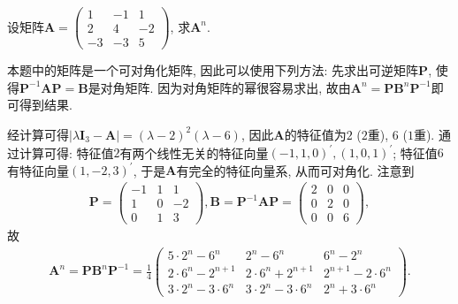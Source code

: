 \documentclass[../../main.tex]{subfiles}
\begin{document}
\begin{example}
设矩阵\(\boldsymbol{A}=\begin{pmatrix}
1&-1&1\\
2&4&-2\\
-3&-3&5
\end{pmatrix}\), 求\(\boldsymbol{A}^{n}\).
\end{example}
\begin{note}
本题中的矩阵是一个可对角化矩阵, 因此可以使用下列方法: 先求出可逆矩阵\(\boldsymbol{P}\), 使得\(\boldsymbol{P}^{-1}\boldsymbol{AP}=\boldsymbol{B}\)是对角矩阵. 因为对角矩阵的幂很容易求出, 故由\(\boldsymbol{A}^{n}=\boldsymbol{P}\boldsymbol{B}^{n}\boldsymbol{P}^{-1}\)即可得到结果.
\end{note}
\begin{solution}    
经计算可得\(\vert\lambda\boldsymbol{I}_{3}-\boldsymbol{A}\vert = (\lambda - 2)^{2}(\lambda - 6)\), 因此\(\boldsymbol{A}\)的特征值为\(2\) (\(2\)重), \(6\) (\(1\)重). 通过计算可得: 特征值\(2\)有两个线性无关的特征向量\((-1,1,0)^{\prime},(1,0,1)^{\prime}\); 特征值\(6\)有特征向量\((1,-2,3)^{\prime}\), 于是\(\boldsymbol{A}\)有完全的特征向量系, 从而可对角化. 注意到
\begin{align*}
\boldsymbol{P}=\begin{pmatrix}
-1&1&1\\
1&0&-2\\
0&1&3
\end{pmatrix}, \boldsymbol{B}=\boldsymbol{P}^{-1}\boldsymbol{AP}=\begin{pmatrix}
2&0&0\\
0&2&0\\
0&0&6
\end{pmatrix},
\end{align*}
故
\begin{align*}
\boldsymbol{A}^{n}=\boldsymbol{P}\boldsymbol{B}^{n}\boldsymbol{P}^{-1}=\frac{1}{4}\begin{pmatrix}
5\cdot 2^{n}-6^{n}&2^{n}-6^{n}&6^{n}-2^{n}\\
2\cdot 6^{n}-2^{n + 1}&2\cdot 6^{n}+2^{n + 1}&2^{n + 1}-2\cdot 6^{n}\\
3\cdot 2^{n}-3\cdot 6^{n}&3\cdot 2^{n}-3\cdot 6^{n}&2^{n}+3\cdot 6^{n}
\end{pmatrix}.
\end{align*} 
\end{solution}
\end{document}
